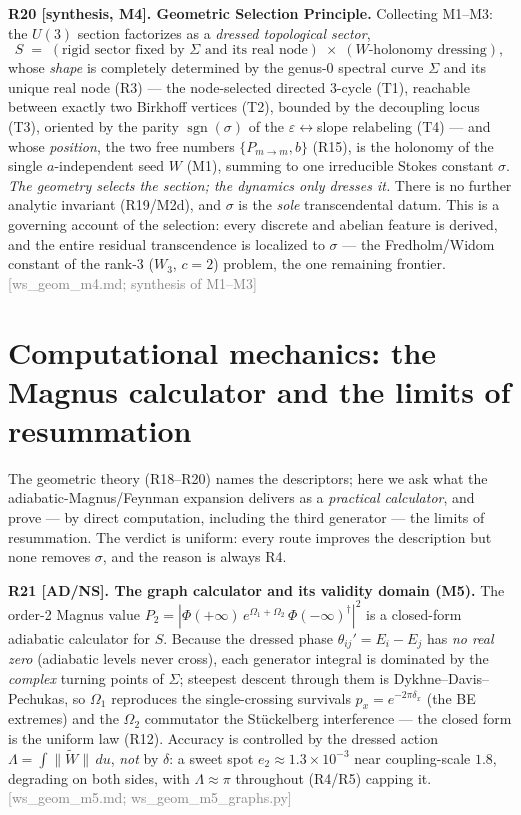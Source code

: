 \documentclass[aps,prd,reprint,nofootinbib]{revtex4-2}
\newcommand{\pnote}[1]{\textcolor{gray}{\footnotesize\,[#1]}}
\newcommand{\eps}{\varepsilon}
\newcommand{\Pmid}{P_{m\to m}}   %
\begin{document}
\textbf{R20 [synthesis, M4]. Geometric Selection Principle.} Collecting M1--M3: the $U(3)$ section
factorizes as a \emph{dressed topological sector},
$$S \;=\; (\text{rigid sector fixed by }\Sigma\text{ and its real node})\;\times\;(\text{$W$-holonomy dressing}),$$
whose \emph{shape} is completely determined by the genus-0 spectral curve $\Sigma$ and its unique real node
(R3) --- the node-selected directed $3$-cycle (T1), reachable between exactly two Birkhoff vertices (T2),
bounded by the decoupling locus (T3), oriented by the parity $\operatorname{sgn}(\sigma)$ of the
$\eps\!\leftrightarrow\!$slope relabeling (T4) --- and whose \emph{position}, the two free numbers
$\{\Pmid,b\}$ (R15), is the holonomy of the single $a$-independent seed $W$ (M1), summing to one irreducible
Stokes constant $\sigma$. \emph{The geometry selects the section; the dynamics only dresses it.} There is no
further analytic invariant (R19/M2d), and $\sigma$ is the \emph{sole} transcendental datum. This is a
governing account of the selection: every discrete and abelian feature is derived, and the entire residual
transcendence is localized to $\sigma$ --- the Fredholm/Widom constant of the rank-3 ($W_3$, $c{=}2$)
problem, the one remaining frontier.\pnote{ws\_geom\_m4.md; synthesis of M1--M3}

\section{Computational mechanics: the Magnus calculator and the limits of resummation}\label{sec:compute}
The geometric theory (R18--R20) names the descriptors; here we ask what the adiabatic-Magnus/Feynman
expansion delivers as a \emph{practical calculator}, and prove --- by direct computation, including the
third generator --- the limits of resummation. The verdict is uniform: every route improves the description
but none removes $\sigma$, and the reason is always R4.

\textbf{R21 [AD/NS]. The graph calculator and its validity domain (M5).} The order-2 Magnus value
$P_2=|\Phi(+\infty)\,e^{\Omega_1+\Omega_2}\,\Phi(-\infty)^\dagger|^2$ is a closed-form adiabatic calculator
for $S$. Because the dressed phase $\theta_{ij}'=E_i-E_j$ has \emph{no real zero} (adiabatic levels never
cross), each generator integral is dominated by the \emph{complex} turning points of $\Sigma$; steepest
descent through them is Dykhne--Davis--Pechukas, so $\Omega_1$ reproduces the single-crossing survivals
$p_x=e^{-2\pi\delta_x}$ (the BE extremes) and the $\Omega_2$ commutator the St\"uckelberg interference ---
the closed form is the uniform law (R12). Accuracy is controlled by the dressed action
$\Lambda=\int\!\|\widetilde W\|\,du$, \emph{not} by $\delta$: a sweet spot $e_2\!\approx\!1.3\times10^{-3}$
near coupling-scale $1.8$, degrading on both sides, with $\Lambda\approx\pi$ throughout (R4/R5) capping
it.\pnote{ws\_geom\_m5.md; ws\_geom\_m5\_graphs.py}
\end{document}
